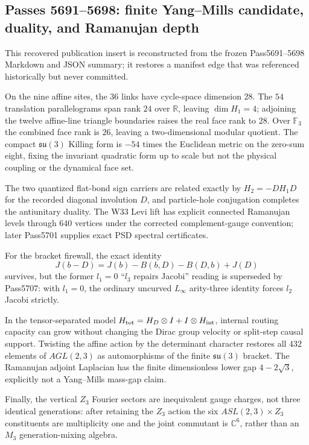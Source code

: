 \subsection{Passes 5691--5698: finite Yang--Mills candidate, duality, and Ramanujan depth}
\label{sec:pass5691-5698-physics-ym-duality-ramanujan}

This recovered publication insert is reconstructed from the frozen Pass5691--5698 Markdown and JSON summary; it restores a manifest edge that was referenced historically but never committed.

On the nine affine sites, the $36$ links have cycle-space dimension $28$. The $54$ translation parallelograms span rank $24$ over $\mathbb R$, leaving $\dim H_1=4$; adjoining the twelve affine-line triangle boundaries raises the real face rank to $28$. Over $\mathbb F_3$ the combined face rank is $26$, leaving a two-dimensional modular quotient. The compact $\mathfrak{su}(3)$ Killing form is $-54$ times the Euclidean metric on the zero-sum eight, fixing the invariant quadratic form up to scale but not the physical coupling or the dynamical face set.

The two quantized flat-bond sign carriers are related exactly by $H_2=-D H_1D$ for the recorded diagonal involution $D$, and particle-hole conjugation completes the antiunitary duality. The W33 Levi lift has explicit connected Ramanujan levels through $640$ vertices under the corrected complement-gauge convention; later Pass5701 supplies exact PSD spectral certificates.

For the bracket firewall, the exact identity
\[
J(b-D)=J(b)-B(b,D)-B(D,b)+J(D)
\]
survives, but the former $l_1=0$ ``$l_3$ repairs Jacobi'' reading is superseded by Pass5707: with $l_1=0$, the ordinary uncurved $L_\infty$ arity-three identity forces $l_2$ Jacobi strictly.

In the tensor-separated model $H_{\rm tot}=H_D\otimes I+I\otimes H_{\rm int}$, internal routing capacity can grow without changing the Dirac group velocity or split-step causal support. Twisting the affine action by the determinant character restores all $432$ elements of $AGL(2,3)$ as automorphisms of the finite $\mathfrak{su}(3)$ bracket. The Ramanujan adjoint Laplacian has the finite dimensionless lower gap $4-2\sqrt3$, explicitly not a Yang--Mills mass-gap claim.

Finally, the vertical $Z_3$ Fourier sectors are inequivalent gauge charges, not three identical generations: after retaining the $Z_3$ action the six $ASL(2,3)\times Z_3$ constituents are multiplicity one and the joint commutant is $\mathbb C^6$, rather than an $M_3$ generation-mixing algebra.

